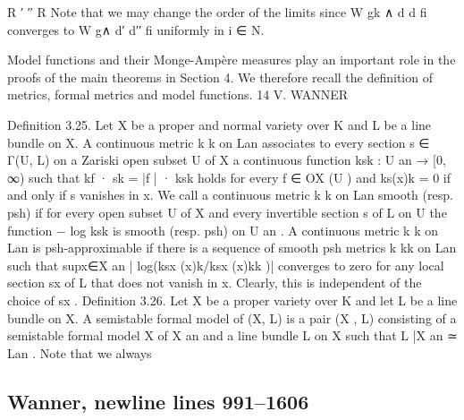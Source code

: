 \documentclass[
  10pt,
]{article}
\newenvironment{Shaded}{}{}
\newcommand{\NormalTok}[1]{#1}
\begin{document}
\begin{Shaded}
\begin{Highlighting}[]
\NormalTok{                                                                           R           ′ ′′}
\NormalTok{                                                                                                              R}
\NormalTok{Note that we may change the order of the limits since                          W gk ∧ d d fi converges to         W g∧}
\NormalTok{d′ d′′ fi uniformly in i ∈ N.                                                                                       }

\NormalTok{   Model functions and their Monge{-}Ampère measures play an important role in the}
\NormalTok{proofs of the main theorems in Section 4. We therefore recall the definition of metrics,}
\NormalTok{formal metrics and model functions.}
\NormalTok{14                                      V. WANNER}


\NormalTok{Definition 3.25. Let X be a proper and normal variety over K and L be a line bundle}
\NormalTok{on X. A continuous metric k k on Lan associates to every section s ∈ Γ(U, L) on a Zariski}
\NormalTok{open subset U of X a continuous function ksk : U an → [0, ∞) such that kf · sk = |f | · ksk}
\NormalTok{holds for every f ∈ OX (U ) and ks(x)k = 0 if and only if s vanishes in x.}
\NormalTok{   We call a continuous metric k k on Lan smooth (resp. psh) if for every open subset U}
\NormalTok{of X and every invertible section s of L on U the function − log ksk is smooth (resp. psh)}
\NormalTok{on U an .}
\NormalTok{   A continuous metric k k on Lan is psh{-}approximable if there is a sequence of smooth}
\NormalTok{psh metrics k kk on Lan such that supx∈X an | log(ksx (x)k/ksx (x)kk )| converges to zero}
\NormalTok{for any local section sx of L that does not vanish in x. Clearly, this is independent of}
\NormalTok{the choice of sx .}
\NormalTok{Definition 3.26. Let X be a proper variety over K and let L be a line bundle on X.}
\NormalTok{A semistable formal model of (X, L) is a pair (X , L) consisting of a semistable formal}
\NormalTok{model X of X an and a line bundle L on X such that L |X an ≃ Lan . Note that we always}
\end{Highlighting}
\end{Shaded}

\subsection{Wanner, newline lines
991--1606}\label{wanner-newline-lines-9911606}
\end{document}
